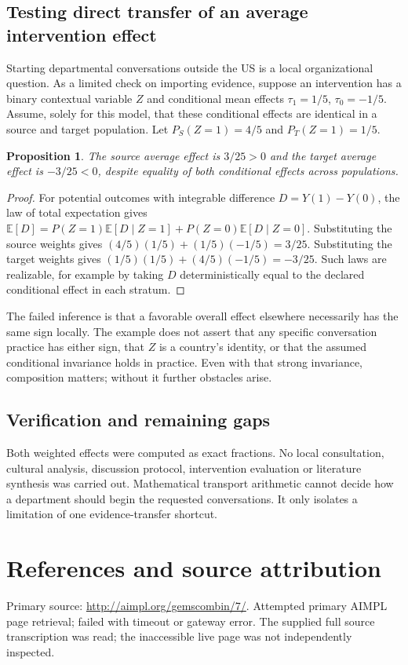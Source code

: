\documentclass[11pt]{article}
\newtheorem{proposition}{Proposition}
\begin{document}
\subsection{Testing direct transfer of an average intervention effect}
Starting departmental conversations outside the US is a local organizational question. As a limited check on importing evidence, suppose an intervention has a binary contextual variable $Z$ and conditional mean effects $\tau_1=1/5$, $\tau_0=-1/5$. Assume, solely for this model, that these conditional effects are identical in a source and target population. Let $P_S(Z=1)=4/5$ and $P_T(Z=1)=1/5$.
\begin{proposition}
The source average effect is $3/25>0$ and the target average effect is $-3/25<0$, despite equality of both conditional effects across populations.
\end{proposition}
\begin{proof}
For potential outcomes with integrable difference $D=Y(1)-Y(0)$, the law of total expectation gives $\mathbb E[D]=P(Z=1)\mathbb E[D\mid Z=1]+P(Z=0)\mathbb E[D\mid Z=0]$. Substituting the source weights gives $(4/5)(1/5)+(1/5)(-1/5)=3/25$. Substituting the target weights gives $(1/5)(1/5)+(4/5)(-1/5)=-3/25$. Such laws are realizable, for example by taking $D$ deterministically equal to the declared conditional effect in each stratum.
\end{proof}
The failed inference is that a favorable overall effect elsewhere necessarily has the same sign locally. The example does not assert that any specific conversation practice has either sign, that $Z$ is a country's identity, or that the assumed conditional invariance holds in practice. Even with that strong invariance, composition matters; without it further obstacles arise.
\subsection{Verification and remaining gaps}
Both weighted effects were computed as exact fractions. No local consultation, cultural analysis, discussion protocol, intervention evaluation or literature synthesis was carried out. Mathematical transport arithmetic cannot decide how a department should begin the requested conversations. It only isolates a limitation of one evidence-transfer shortcut.

\section{References and source attribution}
Primary source: \url{http://aimpl.org/gemscombin/7/}. Attempted primary AIMPL page retrieval; failed with timeout or gateway error. The supplied full source transcription was read; the inaccessible live page was not independently inspected.
\end{document}
